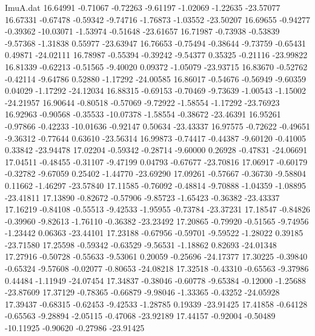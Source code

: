 \begin{filecontents}{ImuA.dat}
  16.64991   -0.71067   -0.72263   -9.61197   -1.02069   -1.22635  -23.57077
  16.67331   -0.67478   -0.59342   -9.74716   -1.76873   -1.03552  -23.50207
  16.69655   -0.94277   -0.39362  -10.03071   -1.53974   -0.51648  -23.61657
  16.71987   -0.73938   -0.53839   -9.57368   -1.31838    0.55977  -23.63947
  16.76653   -0.75494   -0.38644   -9.73759   -0.65431    0.49871  -24.02111
  16.78987   -0.55394   -0.39242   -9.54377    0.35325   -0.21116  -23.99822
  16.81339   -0.62213   -0.51565   -9.40020    0.09372   -1.05079  -23.93715
  16.83670   -0.52762   -0.42114   -9.64786    0.52880   -1.17292  -24.00585
  16.86017   -0.54676   -0.56949   -9.60359    0.04029   -1.17292  -24.12034
  16.88315   -0.69153   -0.70469   -9.73639   -1.00543   -1.15002  -24.21957
  16.90644   -0.80518   -0.57069   -9.72922   -1.58554   -1.17292  -23.76923
  16.92963   -0.90568   -0.35533  -10.07378   -1.58554   -0.38672  -23.46391
  16.95261   -0.97866   -0.42233  -10.01636   -0.92147    0.50634  -23.43337
  16.97575   -0.72622   -0.49651   -9.36312   -0.77644    0.63610  -23.56314
  16.99873   -0.74417   -0.44387   -9.60120   -0.41005    0.33842  -23.94478
  17.02204   -0.59342   -0.28714   -9.60000    0.26928   -0.47831  -24.06691
  17.04511   -0.48455   -0.31107   -9.47199    0.04793   -0.67677  -23.70816
  17.06917   -0.60179   -0.32782   -9.67059    0.25402   -1.44770  -23.69290
  17.09261   -0.57667   -0.36730   -9.58804    0.11662   -1.46297  -23.57840
  17.11585   -0.76092   -0.48814   -9.70888   -1.04359   -1.08895  -23.41811
  17.13890   -0.82672   -0.57906   -9.85723   -1.65423   -0.36382  -23.43337
  17.16219   -0.84108   -0.55513   -9.42533   -1.95955   -0.73784  -23.37231
  17.18547   -0.84826   -0.39960   -9.82613   -1.76110   -0.36382  -23.23492
  17.20865   -0.79920   -0.51565   -9.74956   -1.23442    0.06363  -23.44101
  17.23188   -0.67956   -0.59701   -9.59522   -1.28022    0.39185  -23.71580
  17.25598   -0.59342   -0.63529   -9.56531   -1.18862    0.82693  -24.01348
  17.27916   -0.50728   -0.55633   -9.53061    0.20059   -0.25696  -24.17377
  17.30225   -0.39840   -0.65324   -9.57608   -0.02077   -0.80653  -24.08218
  17.32518   -0.43310   -0.65563   -9.37986    0.44484   -1.11949  -24.07454
  17.34837   -0.38046   -0.60778   -9.65384   -0.12000   -1.25688  -23.87609
  17.37129   -0.78365   -0.66879   -9.98046   -1.33365   -0.43252  -24.05928
  17.39437   -0.68315   -0.62453   -9.42533   -1.28785    0.19339  -23.91425
  17.41858   -0.64128   -0.65563   -9.28894   -2.05115   -0.47068  -23.92189
  17.44157   -0.92004   -0.50489  -10.11925   -0.90620   -0.27986  -23.91425

\end{filecontents}
